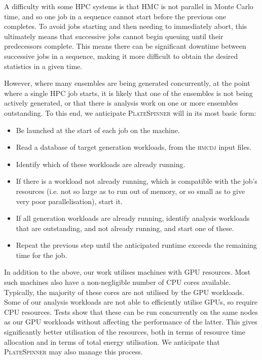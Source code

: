 \documentclass{article}
\newcommand\program[1]{\textsc{#1}\xspace}
\begin{document}
A difficulty with some HPC systems is that
HMC is not parallel in Monte Carlo time,
and so one job in a sequence cannot start before the previous one completes.
To avoid jobs starting and then needing to immediately abort,
this ultimately means that successive jobs cannot begin queuing until
their predecessors complete.
This means there can be significant downtime between successive jobs in a sequence,
making it more difficult to obtain the desired statistics in a given time.

However,
where many ensembles are being generated concurrently,
at the point where a single HPC job starts,
it is likely that one of the ensembles is not being actively generated,
or that there is analysis work on one or more ensembles outstanding.
To this end,
we anticipate \program{PlateSpinner} will in its most basic form:

\begin{itemize}
  \item
        Be launched at the start of each job on the machine.
  \item
        Read a database of target generation workloads,
        from the \program{hmcdj} input files.
  \item
        Identify which of these workloads are already running.
  \item
        If there is a workload not already running,
        which is compatible with the job's resources
        (i.e. not so large as to run out of memory,
        or so small as to give very poor parallelisation),
        start it.
  \item
        If all generation workloads are already running,
        identify analysis workloads that are outstanding,
        and not already running,
        and start one of these.
  \item
        Repeat the previous step until
        the anticipated runtime exceeds the remaining time for the job.
\end{itemize}

In addition to the above,
our work utilises machines with GPU resources.
Most such machines also have a non-negligible number of CPU cores available.
Typically,
the majority of these cores are not utilised by the GPU workloads.
Some of our analysis workloads are not able to efficiently utilise GPUs,
so require CPU resources.
Tests show that these can be run concurrently on the same nodes as our GPU workloads
without affecting the performance of the latter.
This gives significantly better utilisation of the resources,
both in terms of resource time allocation
and in terms of total energy utilisation.
We anticipate that \program{PlateSpinner} may also manage this process.
\end{document}
